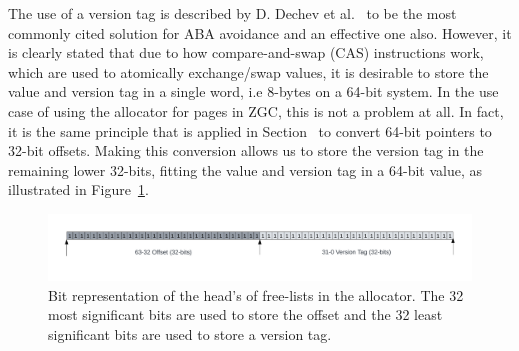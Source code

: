 The use of a version tag is described by D. Dechev et al.~\cite{bjarne_aba} to be the most commonly cited solution for ABA avoidance and an effective one also. However, it is clearly stated that due to how compare-and-swap (CAS) instructions work, which are used to atomically exchange/swap values, it is desirable to store the value and version tag in a single word, i.e 8-bytes on a 64-bit system. In the use case of using the allocator for pages in ZGC, this is not a problem at all. In fact, it is the same principle that is applied in Section~\cite{sec:adaptations_impl:0-byte-header} to convert 64-bit pointers to 32-bit offsets. Making this conversion allows us to store the version tag in the remaining lower 32-bits, fitting the value and version tag in a 64-bit value, as illustrated in Figure~\ref{fig:concurrent_head_bits}.

\begin{figure}[H]
    \centering
    \includegraphics[width=1\textwidth]{figures/concurrent_head_bits.png}
    \caption{Bit representation of the head's of free-lists in the allocator. The 32 most significant bits are used to store the offset and the 32 least significant bits are used to store a version tag.}
    \label{fig:concurrent_head_bits}
\end{figure}


